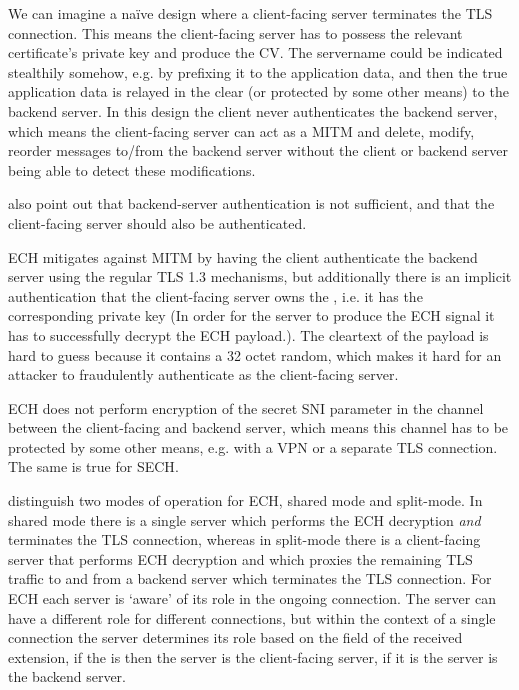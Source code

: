 We can imagine a naïve design where a client-facing server terminates the \ac{TLS} connection.
This means the client-facing server has to possess the relevant certificate's private key and produce the \ac{CV}.
The servername could be indicated stealthily somehow, e.g. by prefixing it to the application data,
and then the true application data is relayed in the clear (or protected by some other means) to the backend server.
In this design the client never authenticates the backend server, which means the client-facing server can act as a \ac{MITM} and delete, modify, reorder messages to/from the backend server without the client or backend server being able to detect these modifications.


\cite{rfc8744-issues} also point out that backend-server authentication is not sufficient,
and that the client-facing server should also be authenticated.

\ac{ECH} mitigates against \ac{MITM}
by having the client authenticate
the backend server using the regular
\ac{TLS} 1.3 mechanisms,
but additionally there is an implicit authentication that the client-facing server owns the ,
i.e. it has the corresponding private key
(In order for the server
to produce the \ac{ECH}  signal
it has to successfully decrypt the \ac{ECH} payload.).
The cleartext of the payload is hard to 
guess because it contains a 32 octet random,
which makes it hard for an attacker
to fraudulently authenticate as the client-facing server.

\ac{ECH} does not perform encryption of the secret \ac{SNI} parameter in the channel between
the client-facing and backend server,
which means this channel has to be protected
by some other means,
e.g. with a \ac{VPN} or a separate \ac{TLS} connection. The same is true for \ac{SECH}.

\cite{esni} distinguish two modes of operation for \ac{ECH}, shared mode and split-mode.
In shared mode there is a single server which performs the \ac{ECH} decryption {\em and} terminates the \ac{TLS} connection,
whereas in split-mode there is a client-facing server that performs \ac{ECH} decryption and which proxies the remaining \ac{TLS} traffic to and from a backend server which terminates the \ac{TLS} connection.
For \ac{ECH} each server is `aware' of its role in the ongoing connection.
The server can have a different role for different connections,
but within the context of a single connection the server determines its role based on the  field of the received  extension,
if the  is  then the server is the client-facing server,
if it is  the server is the backend server.

